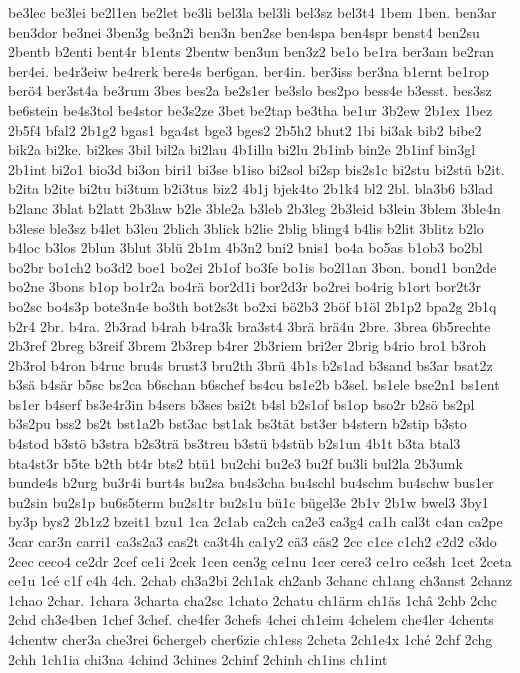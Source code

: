 {be3lec
be3lei
be2l1en
be2let
be3li
bel3la
bel3li
bel3sz
bel3t4
1bem
1ben.
ben3ar
ben3dor
be3nei
3ben3g
be3n2i
ben3n
ben2se
ben4spa
ben4spr
benst4
ben2su
2bentb
b2enti
bent4r
b1ents
2bentw
ben3un
ben3z2
be1o
be1ra
ber3am
be2ran
ber4ei.
be4r3eiw
be4rerk
bere4s
ber6gan.
ber4in.
ber3iss
ber3na
b1ernt
be1rop
berö4
ber3st4a
be3rum
3bes
bes2a
be2s1er
be3slo
bes2po
bess4e
b3esst.
bes3sz
be6stein
be4s3tol
be4stor
be3s2ze
3bet
be2tap
be3tha
be1ur
3b2ew
2b1ex
1bez
2b5f4
bfal2
2b1g2
bgas1
bga4st
bge3
bges2
2b5h2
bhut2
1bi
bi3ak
bib2
bibe2
bik2a
bi2ke.
bi2kes
3bil
bil2a
bi2lau
4b1illu
bi2lu
2b1inb
bin2e
2b1inf
bin3gl
2b1int
bi2o1
bio3d
bi3on
biri1
bi3se
b1iso
bi2sol
bi2sp
bis2s1c
bi2stu
bi2stü
b2it.
b2ita
b2ite
bi2tu
bi3tum
b2i3tus
biz2
4b1j
bjek4to
2b1k4
bl2
2bl.
bla3b6
b3lad
b2lanc
3blat
b2latt
2b3law
b2le
3ble2a
b3leb
2b3leg
2b3leid
b3lein
3blem
3ble4n
b3lese
ble3sz
b4let
b3leu
2blich
3blick
b2lie
2blig
bling4
b4lis
b2lit
3blitz
b2lo
b4loc
b3los
2blun
3blut
3blü
2b1m
4b3n2
bni2
bnis1
bo4a
bo5as
b1ob3
bo2bl
bo2br
bo1ch2
bo3d2
boe1
bo2ei
2b1of
bo3fe
bo1is
bo2l1an
3bon.
bond1
bon2de
bo2ne
3bons
b1op
bo1r2a
bo4rä
bor2d1i
bor2d3r
bo2rei
bo4rig
b1ort
bor2t3r
bo2sc
bo4s3p
bote3n4e
bo3th
bot2s3t
bo2xi
bö2b3
2böf
b1öl
2b1p2
bpa2g
2b1q
b2r4
2br.
b4ra.
2b3rad
b4rah
b4ra3k
bra3st4
3brä
brä4u
2bre.
3brea
6b5rechte
2b3ref
2breg
b3reif
3brem
2b3rep
b4rer
2b3riem
bri2er
2brig
b4rio
bro1
b3roh
2b3rol
b4ron
b4ruc
bru4s
brust3
bru2th
3brü
4b1s
b2s1ad
b3sand
bs3ar
bsat2z
b3sä
b4sär
b5sc
bs2ca
b6schan
b6schef
bs4cu
bs1e2b
b3sel.
bs1ele
bse2n1
bs1ent
bs1er
b4serf
bs3e4r3in
b4sers
b3ses
bsi2t
b4sl
b2s1of
bs1op
bso2r
b2sö
bs2pl
b3s2pu
bss2
bs2t
bst1a2b
bst3ac
bst1ak
bs3tät
bst3er
b4stern
b2stip
b3sto
b4stod
b3stö
b3stra
b2s3trä
bs3treu
b3stü
b4stüb
b2s1un
4b1t
b3ta
btal3
bta4st3r
b5te
b2th
bt4r
bts2
btü1
bu2chi
bu2e3
bu2f
bu3li
bul2la
2b3umk
bunde4s
b2urg
bu3r4i
burt4s
bu2sa
bu4s3cha
bu4schl
bu4schm
bu4schw
bus1er
bu2sin
bu2s1p
bu6s5term
bu2s1tr
bu2s1u
bü1c
bügel3e
2b1v
2b1w
bwel3
3by1
by3p
bys2
2b1z2
bzeit1
bzu1
1ca
2c1ab
ca2ch
ca2e3
ca3g4
ca1h
cal3t
c4an
ca2pe
3car
car3n
carri1
ca3s2a3
cas2t
ca3t4h
ca1y2
cä3
cäs2
2cc
c1ce
c1ch2
c2d2
c3do
2cec
ceco4
ce2dr
2cef
ce1i
2cek
1cen
cen3g
ce1nu
1cer
cere3
ce1ro
ce3sh
1cet
2ceta
ce1u
1cé
c1f
c4h
4ch.
2chab
ch3a2bi
2ch1ak
ch2anb
3chanc
ch1ang
ch3anst
2chanz
1chao
2char.
1chara
3charta
cha2sc
1chato
2chatu
ch1ärm
ch1äs
1châ
2chb
2chc
2chd
ch3e4ben
1chef
3chef.
che4fer
3chefs
4chei
ch1eim
4chelem
che4ler
4chents
4chentw
cher3a
che3rei
6chergeb
cher6zie
ch1ess
2cheta
2ch1e4x
1ché
2chf
2chg
2chh
1ch1ia
chi3na
4chind
3chines
2chinf
2chinh
ch1ins
ch1int
}
